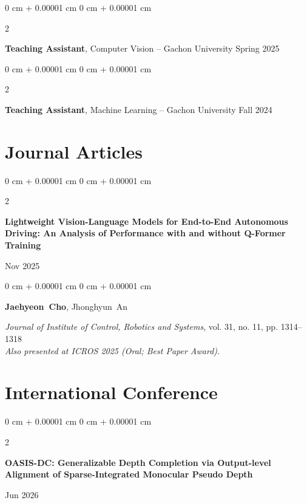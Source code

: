 \documentclass[10pt, letterpaper]{article}
\newenvironment{onecolentry}{
    \begin{adjustwidth}{
        0 cm + 0.00001 cm
    }{
        0 cm + 0.00001 cm
    }
}{
    \end{adjustwidth}
} %
\newenvironment{twocolentry}[2][]{
    \onecolentry
    \def\secondColumn{#2}
    \setcolumnwidth{\fill, 4.5 cm}
    \begin{paracol}{2}
}{
    \switchcolumn \raggedleft \secondColumn
    \end{paracol}
    \endonecolentry
} %
\begin{document}
        \vspace{0.2 cm}

        \begin{twocolentry}{
            Spring 2025
        }
            \textbf{Teaching Assistant}, Computer Vision -- Gachon University\end{twocolentry}

        \vspace{0.2 cm}

        \begin{twocolentry}{
            Fall 2024
        }
            \textbf{Teaching Assistant}, Machine Learning -- Gachon University\end{twocolentry}
        
    \section{Journal Articles}
    
    \begin{twocolentry}{Nov 2025}
      \textbf{Lightweight Vision-Language Models for End-to-End Autonomous Driving: An Analysis of Performance with and without Q-Former Training}
    \end{twocolentry}
    
    \vspace{0.10 cm}
    \begin{onecolentry}
      \mbox{\textbf{Jaehyeon Cho}}, \mbox{Jhonghyun An}
      \vspace{0.10 cm}
    
      \textit{Journal of Institute of Control, Robotics and Systems}, vol. 31, no. 11, pp. 1314--1318 \\
      \emph{Also presented at ICROS 2025 (Oral; Best Paper Award).}
    \end{onecolentry}


    \section{International Conference}
    
    \begin{twocolentry}{Jun 2026}
      \textbf{OASIS-DC: Generalizable Depth Completion via Output-level Alignment of Sparse-Integrated Monocular Pseudo Depth}
    \end{twocolentry}
    
\end{document}
